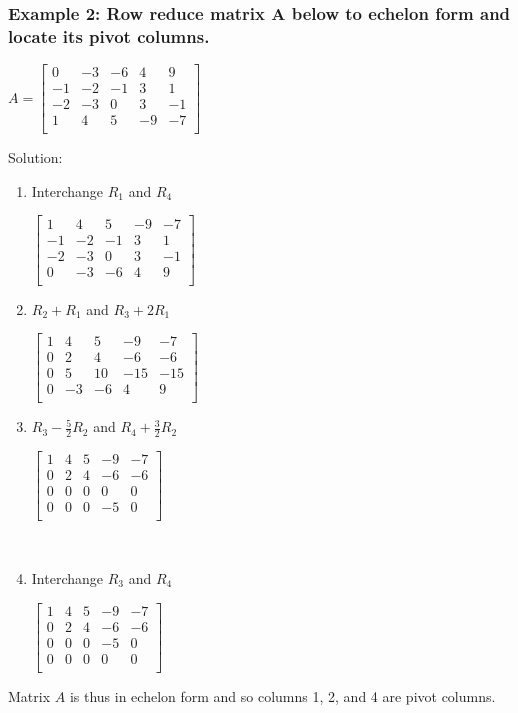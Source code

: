 \documentclass[12pt]{article} %
\begin{document}
\subsubsection{Example 2: Row reduce matrix A below to echelon form and locate its pivot columns.}
\begin{center}
	$A = \begin{bmatrix}
			0 & -3 & -6 & 4 & 9\\
			-1 & -2 & -1 & 3 & 1\\
			-2 & -3 & 0 & 3 & -1\\
			1 & 4 & 5 & -9 & -7\\
		\end{bmatrix}$
\end{center}
Solution:
\begin{enumerate}
\item Interchange $R_1$ and $R_4$
	\begin{center}
		$\begin{bmatrix}
			1 & 4 & 5 & -9 & -7\\
			-1 & -2 & -1 & 3 & 1\\
			-2 & -3 & 0 & 3 & -1\\
			0 & -3 & -6 & 4 & 9\\
		\end{bmatrix}$
	\end{center}
\item $R_2 + R_1$ and $R_3 + 2R_1$
	\begin{center}
		$\begin{bmatrix}
			1 & 4 & 5 & -9 & -7\\
			0 & 2 & 4 & -6 & -6\\
			0 & 5 & 10 & -15 & -15\\
			0 & -3 & -6 & 4 & 9\\
		\end{bmatrix}$
	\end{center}
\item $R_3 -\frac{5}{2}R_2$ and $R_4 + \frac{3}{2}R_2$
	\begin{center}
		$\begin{bmatrix}
			1 & 4 & 5 & -9 & -7\\
			0 & 2 & 4 & -6 & -6\\
			0 & 0 & 0 & 0 & 0\\
			0 & 0 & 0 & -5 & 0\\
		\end{bmatrix}$
	\end{center}
\leavevmode \\
\item Interchange $R_3$ and $R_4$
	\begin{center}
		$\begin{bmatrix}
			1 & 4 & 5 & -9 & -7\\
			0 & 2 & 4 & -6 & -6\\
			0 & 0 & 0 & -5 & 0\\
			0 & 0 & 0 & 0 & 0\\
		\end{bmatrix}$
	\end{center}	
\end{enumerate}
Matrix $A$ is thus in echelon form and so columns 1, 2, and 4 are pivot columns.\\
\end{document}
